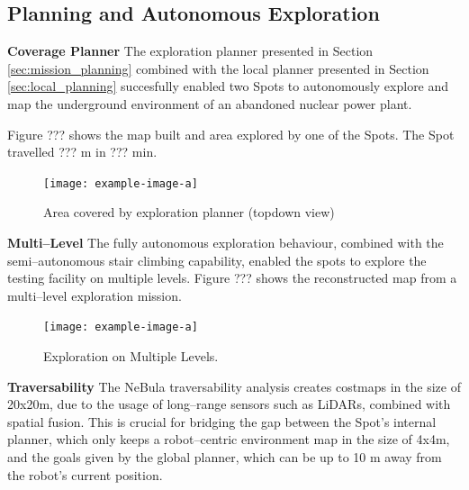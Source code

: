 \documentclass[a4paper, 10pt, conference]{ieeeconf}      %
\begin{document}
\subsection{Planning and Autonomous Exploration}
\textbf{Coverage Planner}
The exploration planner presented in Section \ref{sec:mission_planning} combined with the local planner presented in Section \ref{sec:local_planning} succesfully enabled two Spots to autonomously explore and map the underground environment of an abandoned nuclear power plant.

Figure ??? shows the map built and area explored by one of the Spots.
The Spot travelled ??? m in ??? min.

\begin{figure}[thpb]
  \centering
  \texttt{[image: example-image-a]}
  \caption{Area covered by exploration planner (topdown view)}
  \label{fig:exploration_planner_topview}
\end{figure}

\textbf{Multi--Level}
The fully autonomous exploration behaviour, combined with the semi--autonomous stair climbing capability, enabled the spots to explore the testing facility on multiple levels.
Figure ??? shows the reconstructed map from a multi--level exploration mission.

\begin{figure}[thpb]
  \centering
  \texttt{[image: example-image-a]}
  \caption{Exploration on Multiple Levels.}
  \label{fig:exploration_planner_multilevel}
\end{figure}

\textbf{Traversability}
The NeBula traversability analysis creates costmaps in the size of 20x20m, due to the usage of long--range sensors such as LiDARs, combined with spatial fusion.
This is crucial for bridging the gap between the Spot's internal planner, which only keeps a robot--centric environment map in the size of 4x4m, and the goals given by the global planner, which can be up to 10 m away from the robot's current position.
\end{document}

